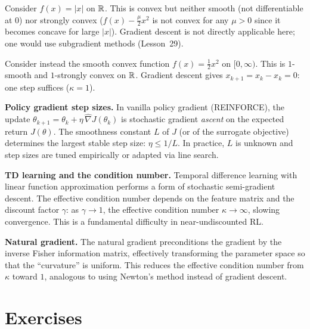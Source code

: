\documentclass[11pt,a4paper]{article}
\begin{document}
\begin{example}\label{ex:not-strong}
Consider $f(x) = |x|$ on $\mathbb{R}$. This is convex but neither smooth (not
differentiable at $0$) nor strongly convex ($f(x) - \frac{\mu}{2}x^2$
is not convex for any $\mu > 0$ since it becomes concave for large $|x|$).
Gradient descent is not directly applicable here; one would use
subgradient methods (Lesson~29).

Consider instead the smooth convex function $f(x) = \frac{1}{2}x^2$ on
$[0, \infty)$. This is $1$-smooth and $1$-strongly convex on $\mathbb{R}$.
Gradient descent gives $x_{k+1} = x_k - x_k = 0$: one step suffices
($\kappa = 1$).
\end{example}

\begin{rlconnection}
\textbf{Policy gradient step sizes.} In vanilla policy gradient
(REINFORCE), the update $\theta_{k+1} = \theta_k + \eta\, \widehat{\nabla}
J(\theta_k)$ is stochastic gradient \emph{ascent} on the expected return
$J(\theta)$. The smoothness constant $L$ of $J$ (or of the surrogate
objective) determines the largest stable step size: $\eta \le 1/L$.
In practice, $L$ is unknown and step sizes are tuned empirically or
adapted via line search.

\textbf{TD learning and the condition number.} Temporal difference learning
with linear function approximation performs a form of stochastic semi-gradient
descent. The effective condition number depends on the feature matrix and the
discount factor $\gamma$: as $\gamma \to 1$, the effective condition number
$\kappa \to \infty$, slowing convergence. This is a fundamental difficulty
in near-undiscounted RL.

\textbf{Natural gradient.} The natural gradient preconditions the gradient
by the inverse Fisher information matrix, effectively transforming the
parameter space so that the ``curvature'' is uniform. This reduces the
effective condition number from $\kappa$ toward $1$, analogous to using
Newton's method instead of gradient descent.
\end{rlconnection}


\section{Exercises}\label{sec:exercises}
\end{document}
